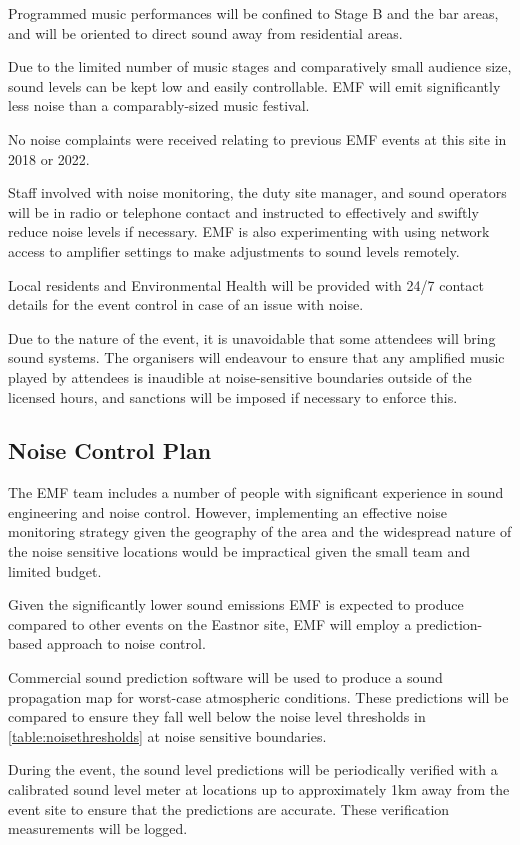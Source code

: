 Programmed music performances will be confined to Stage B and the bar areas, and
will be oriented to direct sound away from residential areas.

Due to the limited number of music stages and comparatively small audience size,
sound levels can be kept low and easily controllable. EMF will emit significantly
less noise than a comparably-sized music festival.

No noise complaints were received relating to previous EMF events at this site in
2018 or 2022.

Staff involved with noise monitoring, the duty site manager, and sound operators
will be in radio or telephone contact and instructed to effectively and swiftly
reduce noise levels if necessary. EMF is also experimenting with using network
access to amplifier settings to make adjustments to sound levels remotely.

Local residents and Environmental Health will be provided with 24/7 contact
details for the event control in case of an issue with noise.

Due to the nature of the event, it is unavoidable that some attendees will
bring sound systems.  The organisers will endeavour to ensure that any
amplified music played by attendees is inaudible at noise-sensitive boundaries
outside of the licensed hours, and sanctions will be imposed if necessary to enforce
this.

\subsection{Noise Control Plan}
The EMF team includes a number of people with significant experience in sound
engineering and noise control. However, implementing an effective noise monitoring
strategy given the geography of the area and the widespread nature of the noise
sensitive locations would be impractical given the small team and limited budget.

Given the significantly lower sound emissions EMF is expected to produce compared to
other events on the Eastnor site, EMF will employ a prediction-based approach to
noise control.

Commercial sound prediction software \cite{noizcalc} will be used to produce a sound
propagation map for worst-case atmospheric conditions. These predictions will be compared
to ensure they fall well below the noise level thresholds in \cref{table:noisethresholds}
at noise sensitive boundaries.

During the event, the sound level predictions will be periodically verified with a
calibrated sound level meter at locations up to approximately 1km away from the event
site to ensure that the predictions are accurate. These verification measurements will
be logged.

